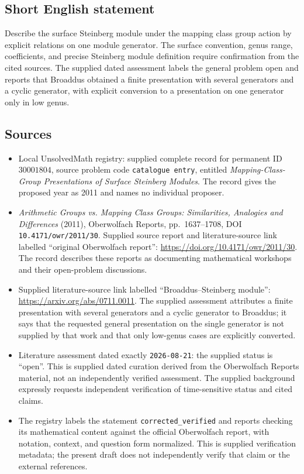 \documentclass[11pt]{article}
\begin{document}
\subsection{Short English statement}
Describe the surface Steinberg module under the mapping class group action by explicit relations on one module generator. The surface convention, genus range, coefficients, and precise Steinberg module definition require confirmation from the cited sources. The supplied dated assessment labels the general problem open and reports that Broaddus obtained a finite presentation with several generators and a cyclic generator, with explicit conversion to a presentation on one generator only in low genus.
\subsection{Sources}
\begin{itemize}
\item Local UnsolvedMath registry: supplied complete record for permanent ID \(30001804\), source problem code \texttt{catalogue entry}, entitled \emph{Mapping-Class-Group Presentations of Surface Steinberg Modules}. The record gives the proposed year as 2011 and names no individual proposer.
\item \emph{Arithmetic Groups vs. Mapping Class Groups: Similarities, Analogies and Differences} (2011), Oberwolfach Reports, pp.\ 1637--1708, DOI \texttt{10.4171/owr/2011/30}. Supplied source report and literature-source link labelled ``original Oberwolfach report'': \url{https://doi.org/10.4171/owr/2011/30}. The record describes these reports as documenting mathematical workshops and their open-problem discussions.
\item Supplied literature-source link labelled ``Broaddus--Steinberg module'': \url{https://arxiv.org/abs/0711.0011}. The supplied assessment attributes a finite presentation with several generators and a cyclic generator to Broaddus; it says that the requested general presentation on the single generator is not supplied by that work and that only low-genus cases are explicitly converted.
\item Literature assessment dated exactly \texttt{2026-08-21}: the supplied status is ``open''. This is supplied dated curation derived from the Oberwolfach Reports material, not an independently verified assessment. The supplied background expressly requests independent verification of time-sensitive status and cited claims.
\item The registry labels the statement \texttt{corrected\_verified} and reports checking its mathematical content against the official Oberwolfach report, with notation, context, and question form normalized. This is supplied verification metadata; the present draft does not independently verify that claim or the external references.
\end{itemize}
\end{document}
